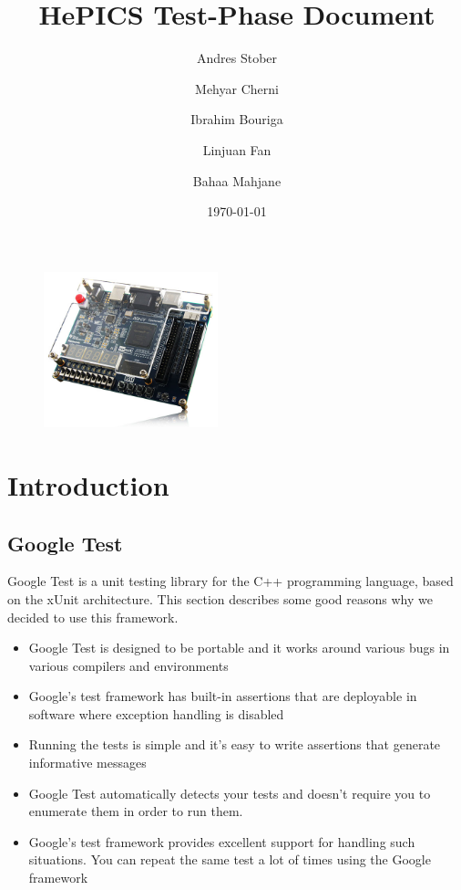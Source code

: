 \documentclass[parskip=full]{scrartcl}
\title{\Huge \textbf{HePICS Test-Phase Document}}
\date{\today \vspace{+10ex}}
\author{Andres Stober \\
	\and Mehyar Cherni \\
	\and Ibrahim Bouriga \\ 
	\and Linjuan Fan \\
	\and Bahaa Mahjane \\ }
\newcommand\tab[1][1cm]{\hspace*{#1}}
\begin{document}
\maketitle
\thispagestyle{empty}


\begin{figure}[b]
\centering
\includegraphics[width=0.45\textwidth, center]{boardimage}
\end{figure}

\pagebreak

\tableofcontents
\thispagestyle{empty}
\pagebreak



\section {Introduction}
	\subsection {Google Test}
	\tab Google Test is a unit testing library for the C++ programming language, based on the xUnit architecture. This section describes some good reasons why we decided to use this framework.
	\begin{itemize}
		\item Google Test is designed to be portable and it works around various bugs in various compilers and environments
		\item Google's test framework has built-in assertions that are deployable in software where exception handling is disabled
		\item Running the tests is simple and it’s easy to write assertions that generate informative messages
		\item Google Test automatically detects your tests and doesn’t require you to enumerate them in order to run them.
		\item Google's test framework provides excellent support for handling such situations. You can repeat the same test a lot of times using the Google framework
	\end{itemize}
	
\end{document}
